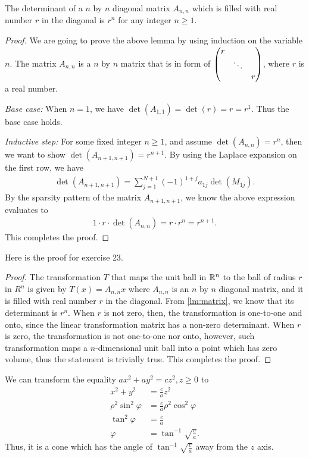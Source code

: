 \documentclass[8pt,twocolumn]{article}
\begin{document}
\begin{Answer}[number=23]
  \begin{lemma}\label{lm:matrix}
    The determinant of a $n$ by $n$ diagonal matrix $A_{n,n}$ which is filled with
    real number $r$ in the diagonal is $r^n$ for any integer $n\ge 1$.
  \end{lemma}
  \begin{proof}
    We are going to prove the above lemma by using induction on the variable
    $n$. The matrix $A_{n,n}$ is a $n$ by $n$ matrix that is in form of
    $\mqty(\dmat{r,\ddots,r})$, where $r$ is a real number.

    \emph{Base case:} When $n=1$, we have $\det(A_{1,1}) = \det(r) = r = r^1$. Thus
    the base case holds.

    \emph{Inductive step:} For some fixed integer $n\ge 1$, and assume
    $\det(A_{n,n}) = r^n$, then we want to show $\det(A_{n+1,n+1}) = r^{n+1}$.
    By using the Laplace expansion on the first row, we have
    \begin{align*}
      \det(A_{n+1,n+1}) = \sum_{j=1}^{N+1}(-1)^{1+j}a_{1j}\det(M_{1j}).
    \end{align*}
    By the sparsity pattern of the matrix $A_{n+1,n+1}$, we know the above
    expression evaluates to
    \begin{align*}
      1\cdot r\cdot \det(A_{n,n}) = r\cdot r^n = r^{n+1}.
    \end{align*}
    This completes the proof.
  \end{proof}
  Here is the proof for exercise 23.
  \begin{proof}
    The transformation $T$ that maps the unit ball in $\mathbb{R}^n$ to the ball of
    radius $r$ in $R^n$ is given by
    \(
      T(x) = A_{n,n} x
    \)
    where $A_{n,n}$ is an $n$ by $n$ diagonal matrix, and it is filled with
    real number $r$ in the diagonal. From \cref{lm:matrix}, we know that its
    determinant is $r^n$. When $r$ is not zero, then, the transformation is
    one-to-one and onto, since the linear transformation matrix has a non-zero
    determinant. When $r$ is zero, the transformation is not one-to-one nor
    onto, however, such transformation maps a $n$-dimensional unit ball into a
    point which has zero volume, thus the statement is trivially true. This
    completes the proof.
  \end{proof}
\end{Answer}

\begin{Answer}[number=24]
  We can transform the equality $ax^2+ay^2=cz^2, z\ge 0$ to
  \begin{align*}
    x^2+y^2&=\frac{c}{a}z^2 \\
    \rho^2 \sin^2\varphi&=\frac{c}{a}\rho^2\cos^2\varphi \\
    \tan^2\varphi&=\frac{c}{a} \\
    \varphi&=\tan^{-1}\sqrt{\frac{c}{a}}.
  \end{align*}
  Thus, it is a cone which has the angle of $\tan^{-1}\sqrt{\frac{c}{a}}$ away
  from the $z$ axis.
\end{Answer}
\end{document}
